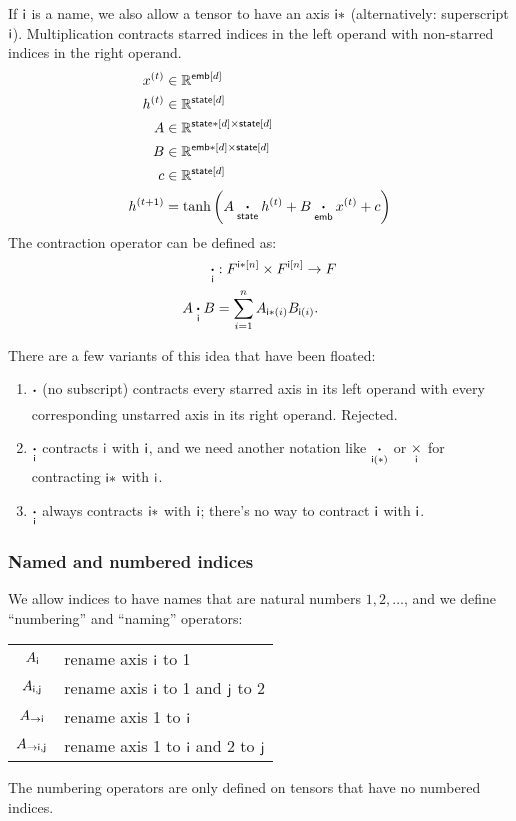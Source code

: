 If $\mathsf{i}$ is a name, we also allow a tensor to have an axis $\mathsf{i*}$ (alternatively: superscript $\mathsf{i}$). Multiplication contracts starred indices in the left operand with non-starred indices in the right operand.
\begin{align*}
x^{(t)} &\in \mathbb{R}^{\mathsf{emb}[d]} \\
h^{(t)} &\in \mathbb{R}^{\mathsf{state}[d]} \\
A &\in \mathbb{R}^{\mathsf{state*}[d] \times \mathsf{state}[d]} \\
B &\in \mathbb{R}^{\mathsf{emb*}[d] \times \mathsf{state}[d]} \\
c &\in \mathbb{R}^{\mathsf{state}[d]} \\
h^{(t+1)} &= \tanh\left( A \mathbin{\mathop{\boldsymbol\cdot}\limits_{\mathsf{state}}} h^{(t)} + B \mathbin{\mathop{\boldsymbol\cdot}\limits_{\mathsf{emb}}} x^{(t)} + c \right) 
\end{align*}
The contraction operator can be defined as:
\begin{align*}
\mathbin{\mathop{\boldsymbol\cdot}\limits_{\mathsf{i}}} &: F^{\mathsf{i*}[n]} \times F^{\mathsf{i}[n]} \rightarrow F \\
A \mathbin{\mathop{\boldsymbol\cdot}\limits_{\mathsf{i}}} B &= \sum_{i=1}^n A_{\mathsf{i*}(i)} B_{\mathsf{i}(i)}.
\end{align*}

There are a few variants of this idea that have been floated:
\begin{enumerate}
\item $\mathbin{\mathop{\boldsymbol\cdot}\limits_{\mathsf{}}}$ (no subscript) contracts every starred axis in its left operand with every corresponding unstarred axis in its right operand. Rejected.
\item $\mathbin{\mathop{\boldsymbol\cdot}\limits_{\mathsf{i}}}$ contracts $\mathsf{i}$ with $\mathsf{i}$, and we need another notation like $\mathbin{\mathop{\boldsymbol\cdot}\limits_{\mathsf{i(*)}}}$ or $\mathbin{\mathop{\times}\limits_{\mathsf{i}}}$ for contracting $\mathsf{i*}$ with $\mathsf{i}$.
\item $\mathbin{\mathop{\boldsymbol\cdot}\limits_{\mathsf{i}}}$ always contracts $\mathsf{i*}$ with $\mathsf{i}$; there's no way to contract $\mathsf{i}$ with $\mathsf{i}$.
\end{enumerate}

\subsubsection{Named and numbered indices}
\label{sec:tensorsoftensors}

We allow indices to have names that are natural numbers $1, 2, \ldots$, and we define ``numbering'' and ``naming'' operators:
\begin{center}
\begin{tabular}{cl}
$A_{\mathsf{i}}$ & rename axis $\mathsf{i}$ to 1 \\
$A_{\mathsf{i},\mathsf{j}}$ & rename axis $\mathsf{i}$ to 1 and $\mathsf{j}$ to 2 \\
$A_{\rightarrow\mathsf{i}}$ & rename axis 1 to $\mathsf{i}$ \\
$A_{\rightarrow\mathsf{i},\mathsf{j}}$ & rename axis 1 to $\mathsf{i}$ and 2 to $\mathsf{j}$
\end{tabular}
\end{center}
The numbering operators are only defined on tensors that have no numbered indices.

